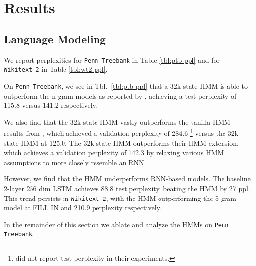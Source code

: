 \documentclass[11pt,a4paper]{article}
\begin{document}
\section{Results}
\subsection{Language Modeling}
We report perplexities 
for \texttt{Penn Treebank} in Table \ref{tbl:ptb-ppl}
and for \texttt{Wikitext-2} in Table \ref{tbl:wt2-ppl}.

On \texttt{Penn Treebank}, we see in Tbl.~\ref{tbl:ptb-ppl}
that a 32k state HMM is able to outperform the n-gram models
as reported by \citet{mikolov2012rnn}, achieving a test perplexity of
115.8 versus 141.2 respectively.

We also find that the 32k state HMM vastly outperforms the vanilla HMM results from \citet{buys2018hmm},
which achieved a validation perplexity of 284.6
\footnote{\citet{buys2018hmm} did not report test perplexity in their experiments.}
versus the 32k state HMM at 125.0.
The 32k state HMM outperforms their HMM extension, which achieves a
validation perplexity of 142.3 by relaxing various HMM assumptions
to more closely resemble an RNN.

However, we find that the HMM underperforms RNN-based models.
The baseline 2-layer 256 dim LSTM achieves 88.8 test perplexity,
beating the HMM by 27 ppl.
This trend persists in \texttt{Wikitext-2},
with the HMM outperforming the 5-gram model at {\color{red}FILL IN}
and 210.9 perplexity respectively.

\begin{comment}
Since the HMMs require parameters linear in the number of hidden states,
we find that the performance of the HMMs scales poorly compared to the other models
which only require parameters that scale linearly with the vocbaulary size.
Although representing and summing over the hidden states
allows us to explicitly capture uncertainty in the hidden state,
it proves to be a limiting factor in terms of performance.
\end{comment}

In the remainder of this section we ablate and analyze the HMMs on \texttt{Penn Treebank}.
\end{document}
